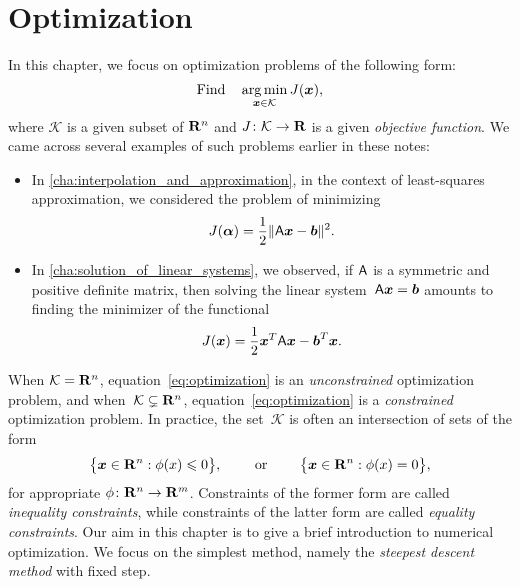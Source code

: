 \chapter{Optimization}%
\label{cha:Optimization}

\minitoc

In this chapter, we focus on optimization problems of the following form:
\begin{equation}
    \label{eq:optimization}
    \text{Find} \quad \operatorname*{arg\,min}_{\mathbf{\boldsymbol{x}} \in \mathcal K} J(\mathbf{\boldsymbol{x}}),
\end{equation}
where $\mathcal K$ is a given subset of $\mathbf R^n$ and $J\colon \mathcal K \to \mathbf R$ is a given \emph{objective function}.
We came across several examples of such problems earlier in these notes:
\begin{itemize}
    \item
        In \cref{cha:interpolation_and_approximation},
        in the context of least-squares approximation,
        we considered the problem of minimizing
        \[
            J(\mathbf{\boldsymbol{\alpha}}) = \frac{1}{2} \lVert \mathsf A \mathbf{\boldsymbol{x}} - \mathbf{\boldsymbol{b}} \rVert^2.
        \]

    \item
        In \cref{cha:solution_of_linear_systems},
        we observed,
        if $\mathsf A$ is a symmetric and positive definite matrix,
        then solving the linear system~$\mathsf A \mathbf{\boldsymbol{x}} = \mathbf{\boldsymbol{b}}$
        amounts to finding the minimizer of the functional
        \[
            J(\mathbf{\boldsymbol{x}})  = \frac{1}{2} \mathbf{\boldsymbol{x}}^T \mathsf A \mathbf{\boldsymbol{x}} - \mathbf{\boldsymbol{b}}^T \mathbf{\boldsymbol{x}}.
        \]
\end{itemize}
When $\mathcal K = \mathbf R^n$,
equation~\eqref{eq:optimization} is an \emph{unconstrained} optimization problem,
and when~$\mathcal K \subsetneq \mathbf R^n$,
equation~\eqref{eq:optimization} is a \emph{constrained} optimization problem.
In practice,
the set~$\mathcal K$ is often an intersection of sets of the form
\[
    \bigl\{ \mathbf{\boldsymbol{x}} \in \mathbf R^n : \phi(x) \leqslant 0 \bigr\},
    \qquad
    \text{ or }
    \qquad
    \bigl\{ \mathbf{\boldsymbol{x}} \in \mathbf R^n : \phi(x) = 0 \bigr\},
\]
for appropriate $\phi\colon \mathbf R^n \to \mathbf R^m$.
Constraints of the former form are called \emph{inequality constraints},
while constraints of the latter form are called \emph{equality constraints}.
Our aim in this chapter is to give a brief introduction to numerical optimization.
We focus on the simplest method,
namely the \emph{steepest descent method} with fixed step.
